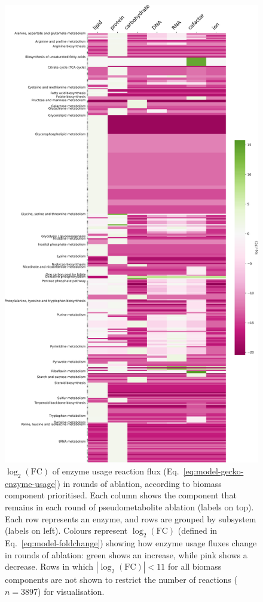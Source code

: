 \begin{figure}
  \centering
  \includegraphics[width=.8\linewidth]{allocation_fc}
  \caption[
    $\log_{2}(\mathrm{FC})$ of enzyme usage reaction flux in rounds of ablation
  ]{
    $\log_{2}(\mathrm{FC})$ of enzyme usage reaction flux (Eq.\ \ref{eq:model-gecko-enzyme-usage}) in rounds of ablation, according to biomass component prioritised.
    Each column shows the component that remains in each round of pseudometabolite ablation (labels on top).
    Each row represents an enzyme, and rows are grouped by subsystem (labels on left).
    Colours represent $\log_{2}(\mathrm{FC})$ (defined in Eq.\ \ref{eq:model-foldchange}) showing how enzyme usage fluxes change in rounds of ablation: green shows an increase, while pink shows a decrease.
    Rows in which $|\log_{2}(\mathrm{FC})| < 11$ for all biomass components are not shown to restrict the number of reactions ($n = \num{3897}$) for visualisation.
  }
  \label{fig:model-ablate-enz-use}
\end{figure}

